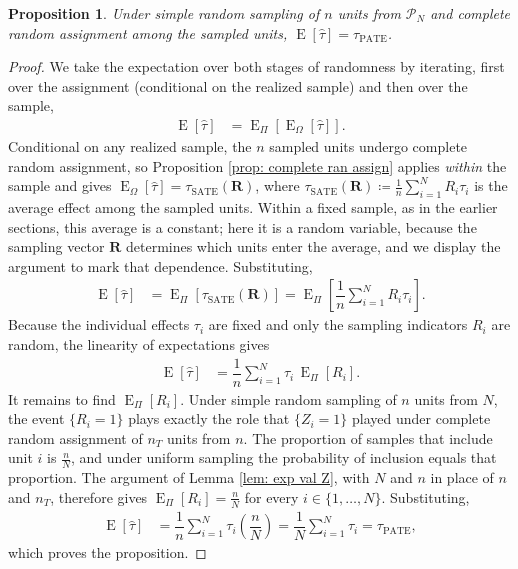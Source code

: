 \documentclass[12pt,leqno]{article}
\theoremstyle{newstyle}
\newtheorem{prop}[thm]{Proposition}
\DeclareMathOperator{\E}{\mathrm{E}}
\DeclareMathOperator{\Var}{\mathrm{Var}}
\newcommand{\bR}{\bm{R}}   \newcommand{\br}{\bm{r}}   %
\newcommand{\EZ}{\E_{\Omega}}    \newcommand{\VarZ}{\Var_{\Omega}}  %
\newcommand{\ER}{\E_{\Pi}}       \newcommand{\VarR}{\Var_{\Pi}}     %
\newcommand{\tauS}{\tau_{\text{SATE}}}
\newcommand{\tauP}{\tau_{\text{PATE}}}
\newcommand{\tauhat}{\hat{\tau}}
\begin{document}
\begin{prop} \label{prop: pate unbiased}
Under simple random sampling of $n$ units from $\mathcal{P}_N$ and complete random assignment among the sampled units, $\E[\tauhat] = \tauP$.
\end{prop}

\begin{proof}
We take the expectation over both stages of randomness by iterating, first over the assignment (conditional on the realized sample) and then over the sample,
\begin{align*}
\E\left[\tauhat\right] & = \ER\left[\EZ\left[\tauhat\right]\right].
\end{align*}
Conditional on any realized sample, the $n$ sampled units undergo complete random assignment, so Proposition \ref{prop: complete ran assign} applies \textit{within} the sample and gives $\EZ[\tauhat] = \tauS(\bR)$, where $\tauS(\bR) \coloneqq \frac{1}{n}\sum_{i = 1}^N R_i \tau_i$ is the average effect among the sampled units. Within a fixed sample, as in the earlier sections, this average is a constant; here it is a random variable, because the sampling vector $\bR$ determines which units enter the average, and we display the argument to mark that dependence. Substituting,
\begin{align*}
\E\left[\tauhat\right] & = \ER\left[\tauS(\bR)\right] = \ER\left[\dfrac{1}{n} \sum \limits_{i = 1}^N R_i \tau_i\right].
\end{align*}
Because the individual effects $\tau_i$ are fixed and only the sampling indicators $R_i$ are random, the linearity of expectations gives
\begin{align*}
\E\left[\tauhat\right] & = \dfrac{1}{n} \sum \limits_{i = 1}^N \tau_i \, \ER\left[R_i\right].
\end{align*}
It remains to find $\ER[R_i]$. Under simple random sampling of $n$ units from $N$, the event $\{R_i = 1\}$ plays exactly the role that $\{Z_i = 1\}$ played under complete random assignment of $n_T$ units from $n$. The proportion of samples that include unit $i$ is $\frac{n}{N}$, and under uniform sampling the probability of inclusion equals that proportion. The argument of Lemma \ref{lem: exp val Z}, with $N$ and $n$ in place of $n$ and $n_T$, therefore gives $\ER[R_i] = \frac{n}{N}$ for every $i \in \{1, \ldots, N\}$. Substituting,
\begin{align*}
\E\left[\tauhat\right] & = \dfrac{1}{n} \sum \limits_{i = 1}^N \tau_i \left(\dfrac{n}{N}\right) = \dfrac{1}{N} \sum \limits_{i = 1}^N \tau_i = \tauP,
\end{align*}
which proves the proposition.
\end{proof}
\end{document}
